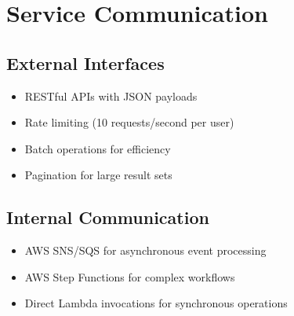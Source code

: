 \documentclass[a4paper, 11pt]{scrreprt}
\begin{document}

\section{Service Communication}

\subsection{External Interfaces}
\begin{itemize}
    \item RESTful APIs with JSON payloads
    \item Rate limiting (10 requests/second per user)
    \item Batch operations for efficiency
    \item Pagination for large result sets
\end{itemize}

\subsection{Internal Communication}
\begin{itemize}
    \item AWS SNS/SQS for asynchronous event processing
    \item AWS Step Functions for complex workflows
    \item Direct Lambda invocations for synchronous operations
\end{itemize}
\end{document}

